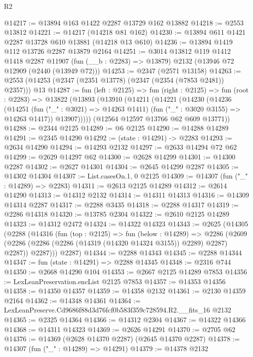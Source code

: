\begin{lexlean}{R2}
\begin{coremodule}
@14217 := @13894 @163 @1422 @2287 @13729 @162 @13882
@14218 := @2553 @13812
@14221 := @14217 (@14218 @81 @162)
@14230 := @13894 @611 @1421 @2287 @13728 @610 @13881 (@14218 @13 @610)
@14236 := @13894 @1419 @112 @13726 @2287 @13879 @2164
@14251 := @3014
    @13812
    @119
    @1412
    @1418
    @2287
    @11907
    (fun (__b : @2283) => @13879)
    @2132
    (@13946 @72 @12909 (@2440 (@13949 @72)))
@14253 := @2347 (@2571 @13158)
@14263 := @2553 (@14253 (@2347 (@2351 @13778) (@2347 (@2354 (@7853 @2481)) @2357))) @13
@14287 := fun (left : @2125) =>
  fun (right : @2125) =>
  fun (root : @2283) =>
  @13822
    (@13893
      (@13910
        (@14211
          (@14221
            (@14230
              (@14236
                (@14251
                  (fun ("_" : @3021) => @14263 @1411)
                  (fun ("_" : @3020 @3155) => @14263 @1417))
                @13907)))))
      (@12564 @12597 @13766 @62 @609 @13771))
@14288 := @2344 @2125
@14289 := @6 @2125
@14290 := @14288 @14289
@14291 := @2345 @14290
@14292 := (state : @14291) -> @2283
@14293 := @2634 @14290
@14294 := @14293 @2132
@14297 := @2633 @14294 @72 @62
@14299 := @2629 @14297 @62
@14300 := @2628 @14299
@14301 := @14300 @2287
@14302 := @2627 @14301
@14304 := @2645 @14299 @2287
@14305 := @14302 @14304
@14307 := List.casesOn.{1, 0} @2125
@14309 := @14307 (fun ("_" : @14289) => @2283)
@14311 := @2613 @2125 @14289
@14312 := @2614 @14290
@14313 := @14312 @2132
@14314 := @14311 @14313
@14316 := @14309 @14314 @2287
@14317 := @2288 @3435
@14318 := @2288 @14317
@14319 := @2286 @14318
@14320 := @13785 @2304
@14322 := @2610 @2125 @14289
@14323 := @14312 @2472
@14324 := @14322 @14323
@14343 := @2625
    (@14305
      (@2288
        (@14316
          (fun (top : @2125) =>
          fun (below : @14289) =>
          @2286
            (@2609 (@2286 (@2286 (@2286 (@14319 (@14320 @14324 @3155)) @2289) @2287) @2287))
            @2287)))
      @2287)
@14344 := @2288 @14343
@14345 := @2288 @14344
@14347 := fun (state : @14291) => @2288 @14345
@14348 := @2316 @744
@14350 := @2668 @14290 @104
@14353 := @2667 @2125 @14289 @7853
@14356 := LexLeanPreservation.encList @2125 @7853
@14357 := @14353 @14356
@14358 := @14350 @14357
@14359 := @14358 @2132
@14361 := @2130 @14359 @2164
@14362 := @14348 @14361
@14364 := LexLeanPreserve.Cd9686f88d3d76fcf0b583f359c728594.R2.__fits_16 @2132
@14365 := @2325 @14364
@14366 := @14312 @2304
@14367 := @14322 @14366
@14368 := @14311 @14323
@14369 := @2626 @14291
@14370 := @2705 @62
@14376 := @14369 (@2628 @14370 @2287) (@2645 @14370 @2287)
@14378 := @14307 (fun ("_" : @14289) => @14291)
@14379 := @14378 @2132

\end{coremodule}
\end{lexlean}
